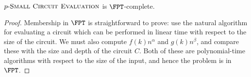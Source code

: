 \documentclass{article}
\newcommand{\dash}{\textnormal{-}}
\begin{document}
\begin{theorem}
  $p \dash \textsc{Small Circuit Evaluation}$ is $\FPT$-complete.
\end{theorem}
\begin{proof}
  Membership in $\FPT$ is straightforward to prove: use the natural algorithm for evaluating a circuit which can be performed in linear time with respect to the size of the circuit.
  We must also compute $f(k) n^\alpha$ and $g(k) n^\beta$, and compare these with the size and depth of the circuit $C$.
  Both of these are polynomial-time algorithms with respect to the size of the input, and hence the problem is in $\FPT$.




\end{proof}
\end{document}
